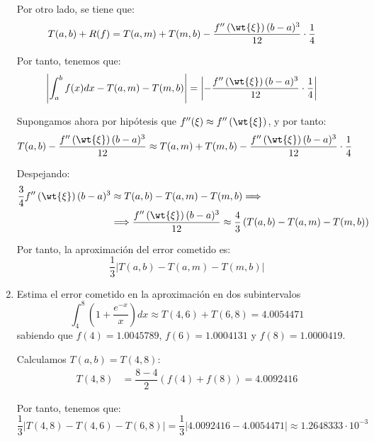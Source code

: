 \begin{ejercicio}
\begin{enumerate}
        Por otro lado, se tiene que:
        \begin{align*}
            T(a,b) + R(f) &= T(a,m) + T(m,b) -\dfrac{f''\left(\wt{\xi}\right)(b-a)^3}{12}\cdot \frac{1}{4}
        \end{align*}

        Por tanto, tenemos que:
        \begin{align*}
            \left|\int_{a}^{b} f(x) dx - T(a, m) - T(m, b)\right| &= \left|-\dfrac{f''\left(\wt{\xi}\right)(b-a)^3}{12}\cdot \frac{1}{4}\right|
        \end{align*}

        Supongamos ahora por hipótesis que $f''(\xi)\approx f''\left(\wt{\xi}\right)$, y por tanto:
        \begin{align*}
            T(a,b) -\dfrac{f''\left(\wt{\xi}\right)(b-a)^3}{12} &\approx T(a,m) + T(m,b) -\dfrac{f''\left(\wt{\xi}\right)(b-a)^3}{12}\cdot \frac{1}{4}
        \end{align*}

        Despejando:
        \begin{align*}
            \dfrac{3}{4}f''\left(\wt{\xi}\right)(b-a)^3 &\approx T(a,b) - T(a,m) - T(m,b)
            \Longrightarrow \\ &\Longrightarrow
            \dfrac{f''\left(\wt{\xi}\right)(b-a)^3}{12} \approx \dfrac{4}{3}\left(T(a,b) - T(a,m) - T(m,b)\right)
        \end{align*}

        Por tanto, la aproximación del error cometido es:
        \begin{equation*}
            \dfrac{1}{3}\left|T(a,b) - T(a,m) - T(m,b)\right|
        \end{equation*}

        \item Estima el error cometido en la aproximación en dos subintervalos
        \begin{equation*}
            \int_{4}^{8} \left(1 + \frac{e^{-x}}{x}\right)dx \approx T(4, 6) + T(6, 8) = 4.0054471
        \end{equation*}
        sabiendo que $f(4) = 1.0045789$, $f(6) = 1.0004131$ y $f(8) = 1.0000419$.

        Calculamos $T(a,b)=T(4,8)$:
        \begin{align*}
            T(4,8) &= \dfrac{8-4}{2}\left(f(4) + f(8)\right) = 4.0092416
        \end{align*}

        Por tanto, tenemos que:
        \begin{equation*}
            \dfrac{1}{3}\left|T(4,8) - T(4,6) - T(6,8)\right| = \dfrac{1}{3}\left|4.0092416 - 4.0054471\right| \approx 1.2648333\cdot 10^{-3}
        \end{equation*}
    \end{enumerate}
\end{ejercicio}

